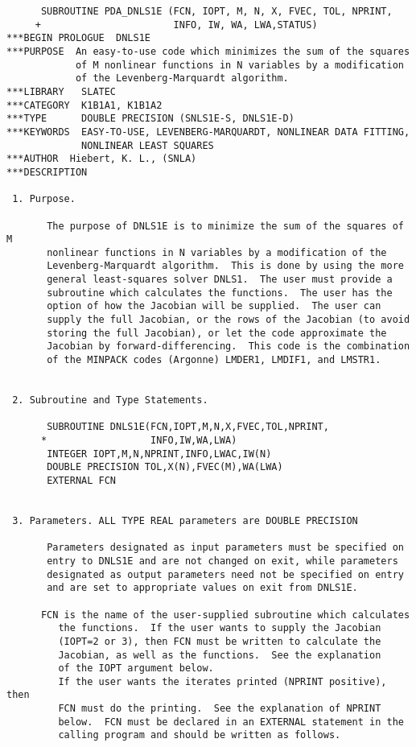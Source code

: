 \begin{verbatim}
      SUBROUTINE PDA_DNLS1E (FCN, IOPT, M, N, X, FVEC, TOL, NPRINT,
     +                       INFO, IW, WA, LWA,STATUS)
***BEGIN PROLOGUE  DNLS1E
***PURPOSE  An easy-to-use code which minimizes the sum of the squares
            of M nonlinear functions in N variables by a modification
            of the Levenberg-Marquardt algorithm.
***LIBRARY   SLATEC
***CATEGORY  K1B1A1, K1B1A2
***TYPE      DOUBLE PRECISION (SNLS1E-S, DNLS1E-D)
***KEYWORDS  EASY-TO-USE, LEVENBERG-MARQUARDT, NONLINEAR DATA FITTING,
             NONLINEAR LEAST SQUARES
***AUTHOR  Hiebert, K. L., (SNLA)
***DESCRIPTION

 1. Purpose.

       The purpose of DNLS1E is to minimize the sum of the squares of M
       nonlinear functions in N variables by a modification of the
       Levenberg-Marquardt algorithm.  This is done by using the more
       general least-squares solver DNLS1.  The user must provide a
       subroutine which calculates the functions.  The user has the
       option of how the Jacobian will be supplied.  The user can
       supply the full Jacobian, or the rows of the Jacobian (to avoid
       storing the full Jacobian), or let the code approximate the
       Jacobian by forward-differencing.  This code is the combination
       of the MINPACK codes (Argonne) LMDER1, LMDIF1, and LMSTR1.


 2. Subroutine and Type Statements.

       SUBROUTINE DNLS1E(FCN,IOPT,M,N,X,FVEC,TOL,NPRINT,
      *                  INFO,IW,WA,LWA)
       INTEGER IOPT,M,N,NPRINT,INFO,LWAC,IW(N)
       DOUBLE PRECISION TOL,X(N),FVEC(M),WA(LWA)
       EXTERNAL FCN


 3. Parameters. ALL TYPE REAL parameters are DOUBLE PRECISION

       Parameters designated as input parameters must be specified on
       entry to DNLS1E and are not changed on exit, while parameters
       designated as output parameters need not be specified on entry
       and are set to appropriate values on exit from DNLS1E.

      FCN is the name of the user-supplied subroutine which calculates
         the functions.  If the user wants to supply the Jacobian
         (IOPT=2 or 3), then FCN must be written to calculate the
         Jacobian, as well as the functions.  See the explanation
         of the IOPT argument below.
         If the user wants the iterates printed (NPRINT positive), then
         FCN must do the printing.  See the explanation of NPRINT
         below.  FCN must be declared in an EXTERNAL statement in the
         calling program and should be written as follows.



\end{verbatim}
